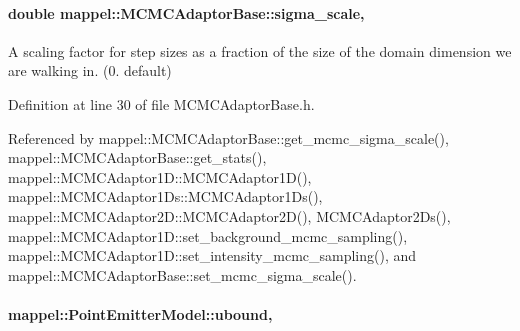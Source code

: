 \paragraph[{\texorpdfstring{sigma\+\_\+scale}{sigma_scale}}]{\setlength{\rightskip}{0pt plus 5cm}double mappel\+::\+M\+C\+M\+C\+Adaptor\+Base\+::sigma\+\_\+scale\hspace{0.3cm}{\ttfamily [protected]}, {\ttfamily [inherited]}}\hypertarget{classmappel_1_1MCMCAdaptorBase_a76312f7d589bf3f3e754beca174b884b}{}\label{classmappel_1_1MCMCAdaptorBase_a76312f7d589bf3f3e754beca174b884b}
A scaling factor for step sizes as a fraction of the size of the domain dimension we are walking in. (0. default) 

Definition at line 30 of file M\+C\+M\+C\+Adaptor\+Base.\+h.



Referenced by mappel\+::\+M\+C\+M\+C\+Adaptor\+Base\+::get\+\_\+mcmc\+\_\+sigma\+\_\+scale(), mappel\+::\+M\+C\+M\+C\+Adaptor\+Base\+::get\+\_\+stats(), mappel\+::\+M\+C\+M\+C\+Adaptor1\+D\+::\+M\+C\+M\+C\+Adaptor1\+D(), mappel\+::\+M\+C\+M\+C\+Adaptor1\+Ds\+::\+M\+C\+M\+C\+Adaptor1\+Ds(), mappel\+::\+M\+C\+M\+C\+Adaptor2\+D\+::\+M\+C\+M\+C\+Adaptor2\+D(), M\+C\+M\+C\+Adaptor2\+Ds(), mappel\+::\+M\+C\+M\+C\+Adaptor1\+D\+::set\+\_\+background\+\_\+mcmc\+\_\+sampling(), mappel\+::\+M\+C\+M\+C\+Adaptor1\+D\+::set\+\_\+intensity\+\_\+mcmc\+\_\+sampling(), and mappel\+::\+M\+C\+M\+C\+Adaptor\+Base\+::set\+\_\+mcmc\+\_\+sigma\+\_\+scale().

\paragraph[{\texorpdfstring{ubound}{ubound}}]{ mappel\+::\+Point\+Emitter\+Model\+::ubound\hspace{0.3cm}{\ttfamily [protected]}, {\ttfamily [inherited]}}\hypertarget{classmappel_1_1PointEmitterModel_a35b883e84b6a2e0093bdf482c623beef}{}\label{classmappel_1_1PointEmitterModel_a35b883e84b6a2e0093bdf482c623beef}


